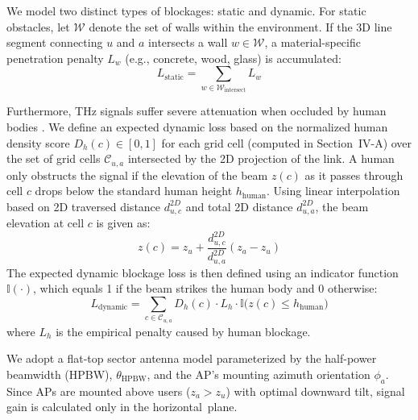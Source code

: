\documentclass[conference]{IEEEtran}
\begin{document}
	We model two distinct types of blockages: static and dynamic. For static obstacles, let $\mathcal{W}$ denote the set of walls within the environment. If the 3D line segment connecting $u$ and $a$ intersects a wall $w \in \mathcal{W}$, a material-specific penetration penalty $L_{w}$ (e.g., concrete, wood, glass) is accumulated:
	\begin{equation}
		L_{\text{static}} = \sum_{w \in \mathcal{W}_{\text{intersect}}} L_{w}
	\end{equation}
	
	Furthermore, THz signals suffer severe attenuation when occluded by human bodies \cite{b3}. We define an expected dynamic loss based on the normalized human density score $D_h(c) \in [0,1]$ for each grid cell (computed in Section~IV-A) over the set of grid cells $\mathcal{C}_{u,a}$ intersected by the 2D projection of the link.  A human only obstructs the signal if the elevation of the beam $z(c)$ as it passes through cell $c$ drops below 
	the standard human height $h_{\text{human}}$.  
	Using linear interpolation based on 2D traversed distance $d_{u,c}^{2D}$ and total 2D distance $d_{u,a}^{2D}$, the beam elevation at cell $c$ is given as:
	\begin{equation}
		z(c) = z_u + \frac{d_{u,c}^{2D}}{d_{u,a}^{2D}} (z_a - z_u)
	\end{equation}
	The expected dynamic blockage loss is then defined using an indicator function $\mathbb{I}(\cdot)$, which equals 1 if the beam strikes the human body and 0 otherwise:
	\begin{equation}
		L_{\text{dynamic}} = \sum_{c \in \mathcal{C}_{u,a}} D_h(c) \cdot L_{h} \cdot \mathbb{I}\Big(z(c) \le h_{\text{human}}\Big)
		\label{eq:dynamic_loss}
	\end{equation}
	where $L_{h}$ is the empirical penalty caused by human blockage.
	
	We adopt a flat-top sector antenna model parameterized by the half-power beamwidth (HPBW), $\theta_{\text{HPBW}}$, and the AP's mounting azimuth orientation $\phi_a$. Since APs are mounted above users ($z_a > z_u$) with optimal downward tilt, signal gain is calculated only in the horizontal~plane.
	
\end{document}

